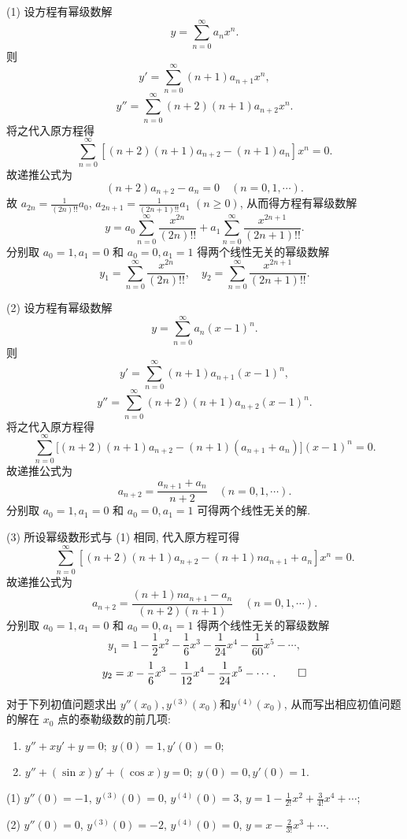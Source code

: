 \begin{solution}
  (1) 设方程有幂级数解
  \[y=\sum_{n=0}^{\infty}a_nx^n.\]
  则
  \[y'=\sum_{n=0}^{\infty}(n+1)a_{n+1}x^n,\]
  \[y''=\sum_{n=0}^{\infty}(n+2)(n+1)a_{n+2}x^n.\]
  将之代入原方程得
  \[\sum_{n=0}^{\infty}[(n+2)(n+1)a_{n+2}-(n+1)a_n]x^n=0.\]
  故递推公式为
  \[(n+2)a_{n+2}-a_n=0\quad (n=0,1,\cdots).\]
  故 $a_{2n}=\frac{1}{(2n)!!}a_0$, $a_{2n+1}=\frac{1}{(2n+1)!!}a_1$ $(n\geq 0)$, 从而得方程有幂级数解
  \[y=a_0\sum_{n=0}^{\infty}\frac{x^{2n}}{(2n)!!}+a_1\sum_{n=0}^{\infty}\frac{x^{2n+1}}{(2n+1)!!}.\]
  分别取 $a_0=1,a_1=0$ 和 $a_0=0,a_1=1$ 得两个线性无关的幂级数解
  \[y_1=\sum_{n=0}^{\infty}\frac{x^{2n}}{(2n)!!},\quad
    y_2=\sum_{n=0}^{\infty}\frac{x^{2n+1}}{(2n+1)!!}.\]

  (2) 设方程有幂级数解
  \[y=\sum_{n=0}^{\infty}a_n(x-1)^n.\]
  则
  \[y'=\sum_{n=0}^{\infty}(n+1)a_{n+1}(x-1)^n,\]
  \[y''=\sum_{n=0}^{\infty}(n+2)(n+1)a_{n+2}(x-1)^n.\]
  将之代入原方程得
  \[\sum_{n=0}^{\infty}\big[(n+2)(n+1)a_{n+2}-(n+1)(a_{n+1}+a_n)\big](x-1)^n=0.\]
  故递推公式为
  \[a_{n+2}=\frac{a_{n+1}+a_n}{n+2}\quad (n=0,1,\cdots).\]
  分别取 $a_0=1,a_1=0$ 和 $a_0=0,a_1=1$ 可得两个线性无关的解.

  (3) 所设幂级数形式与 (1) 相同, 代入原方程可得
  \[\sum_{n=0}^{\infty}[(n+2)(n+1)a_{n+2}-(n+1)na_{n+1}+a_n]x^n=0.\]
  故递推公式为
  \[a_{n+2}=\frac{(n+1)na_{n+1}-a_n}{(n+2)(n+1)}\quad (n=0,1,\cdots).\]
  分别取 $a_0=1,a_1=0$ 和 $a_0=0,a_1=1$ 得两个线性无关的幂级数解
  \[y_1=1-\frac{1}{2}x^2-\frac{1}{6}x^3-\frac{1}{24}x^4-\frac{1}{60}x^5-\cdots,\]
  \[y_2=x-\frac{1}{6}x^3-\frac{1}{12}x^4-\frac{1}{24}x^5-\cdots.\qedhere\]
\end{solution}



\begin{exercise}
  对于下列初值问题求出 $y''(x_0),y^{(3)}(x_0)$和$y^{(4)}(x_0)$, 
  从而写出相应初值问题的解在 $x_0$ 点的泰勒级数的前几项:
  \begin{enumerate}[(1)]
  \item $y''+xy'+y=0;\;y(0)=1,y'(0)=0;$
  \item $y''+(\sin x)y'+(\cos x)y=0;\;y(0)=0,y'(0)=1$.\
  \end{enumerate}
\end{exercise}

\begin{solution}
  (1) $y''(0)=-1$, $y^{(3)}(0)=0$, $y^{(4)}(0)=3$, $y=1-\frac{1}{2!}x^2+\frac{3}{4!}x^4+\cdots$;

  (2) $y''(0)=0$, $y^{(3)}(0)=-2$, $y^{(4)}(0)=0$, $y=x-\frac{2}{3!}x^3+\cdots$.
\end{solution}



